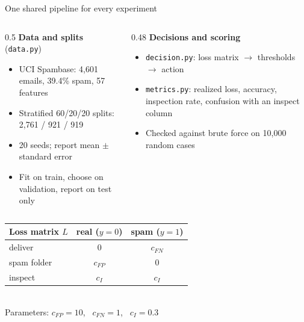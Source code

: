 \documentclass[aspectratio=169,11pt]{beamer}
\newcommand{\thepresenter}{}
\newcommand{\presenter}[1]{\renewcommand{\thepresenter}{#1}}
\newcommand{\cfp}{c_{FP}}
\newcommand{\cfn}{c_{FN}}
\newcommand{\ci}{c_I}
\begin{document}
\presenter{Vismay V Shanbhag}
\begin{frame}{One shared pipeline for every experiment}
\begin{columns}[T]
\begin{column}{0.5\textwidth}
\textbf{Data and splits} (\texttt{data.py})
\begin{itemize}
  \item UCI Spambase: 4{,}601 emails, 39.4\% spam, 57 features
  \item Stratified 60/20/20 splits: 2{,}761 / 921 / 919
  \item 20 seeds; report mean $\pm$ standard error
  \item Fit on train, choose on validation, report on test only
\end{itemize}
\end{column}
\begin{column}{0.48\textwidth}
\textbf{Decisions and scoring}
\begin{itemize}
  \item \texttt{decision.py}: loss matrix $\to$ thresholds $\to$ action
  \item \texttt{metrics.py}: realized loss, accuracy, inspection rate, confusion with an inspect column
  \item Checked against brute force on 10{,}000 random cases
\end{itemize}
\end{column}
\end{columns}
\vspace{0.8em}
\centering
\begin{tabular}{lcc}
\toprule
Loss matrix $L$ & real ($y=0$) & spam ($y=1$)\\
\midrule
deliver & $0$ & $\cfn$\\
spam folder & $\cfp$ & $0$\\
inspect & $\ci$ & $\ci$\\
\bottomrule
\end{tabular}\\[0.6em]
{\small Parameters: $\cfp=10$, \ $\cfn=1$, \ $\ci=0.3$}
\end{frame}
\end{document}
